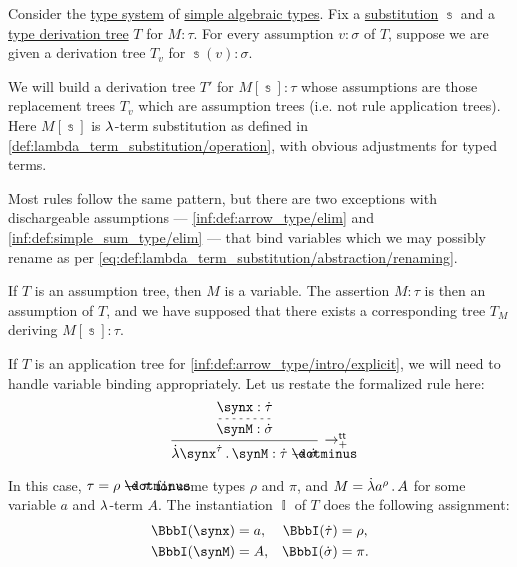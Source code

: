 \begin{algorithm}\label{alg:simply_typed_substitution}
  Consider the \hyperref[def:abstract_type_system]{type system} of \hyperref[def:simple_algebraic_types]{simple algebraic types}. Fix a \hyperref[def:lambda_term_substitution]{substitution} \( \Bbbs \) and a \hyperref[def:type_derivation_tree]{type derivation tree} \( T \) for \( M: \tau \). For every assumption \( v: \sigma \) of \( T \), suppose we are given a derivation tree \( T_v \) for \( \Bbbs(v): \sigma \).

  We will build a derivation tree \( T' \) for \( M[\Bbbs]: \tau \) whose assumptions are those replacement trees \( T_v \) which are assumption trees (i.e. not rule application trees). Here \( M[\Bbbs] \) is \( {\mathrm \lambda} \)-term substitution as defined in \cref{def:lambda_term_substitution/operation}, with obvious adjustments for typed terms.

  Most rules follow the same pattern, but there are two exceptions with dischargeable assumptions --- \ref{inf:def:arrow_type/elim} and \ref{inf:def:simple_sum_type/elim} --- that bind variables which we may possibly rename as per \eqref{eq:def:lambda_term_substitution/abstraction/renaming}.

  \begin{thmenum}
     If \( T \) is an assumption tree, then \( M \) is a variable. The assertion \( M: \tau \) is then an assumption of \( T \), and we have supposed that there exists a corresponding tree \( T_M \) deriving \( M[\Bbbs]: \tau \).

     If \( T \) is an application tree for \ref{inf:def:arrow_type/intro/explicit}, we will need to handle variable binding appropriately. Let us restate the formalized rule here:
    \begin{equation*}
      \begin{prooftree}
        \hypo{ \synx: \syn\tau }
        \infer[dashed]1{ \synM: \syn\sigma }
        \infer1[\ensuremath{ \rightarrow_+^{\logic{tt}} }]{ \qabs {\synx^{\syn\tau}} \synM: \syn\tau \synimplies \syn\sigma }
      \end{prooftree}
    \end{equation*}

    In this case, \( \tau = \rho \synimplies \pi \) for some types \( \rho \) and \( \pi \), and \( M = \qabs {a^\rho} A \) for some variable \( a \) and \( {\mathrm \lambda} \)-term \( A \). The instantiation \( \BbbI \) of \( T \) does the following assignment:
    \begin{align*}
      \BbbI(\synx) &= a, &\BbbI(\syn\tau) &= \rho, \\
      \BbbI(\synM) &= A, &\BbbI(\syn\sigma) &= \pi.
    \end{align*}


\end{thmenum}
\end{algorithm}
